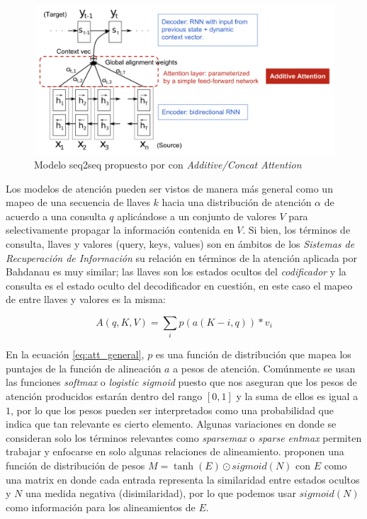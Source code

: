 \begin{figure}[ht!]
    \centering
    \includegraphics[width=0.8 \textwidth]{Chapters/2. Transformer/Figures/rnn/attention.png}
    \caption{Modelo seq2seq propuesto por \citeauthor*{bahdanau2016neural} con \textit{Additive/Concat Attention}}
    \label{fig:att}
\end{figure}

Los modelos de atención pueden ser vistos de manera más general como un mapeo de una secuencia de
llaves $k$ hacia una distribución de atención $\alpha$ de acuerdo a una consulta $q$ aplicándose a un
conjunto de valores $V$ para selectivamente propagar la información contenida en $V$.
Si bien, los términos de consulta, llaves y valores (query, keys, values)
son en ámbitos de los \textit{Sistemas de Recuperación de Información} su relación en términos de
la atención aplicada por Bahdanau es muy similar; las llaves son los estados ocultos del \textit{codificador}
y la consulta es el estado oculto del decodificador en cuestión, en este caso el mapeo de entre llaves
y valores es la misma:

\begin{equation}
    A(q, K, V) = \sum_i p(a(K-i, q)) * v_i
    \label{eq:att_general}
\end{equation}

En la ecuación \ref{eq:att_general}, $p$ es una función de distribución que mapea los puntajes de la
función de alineación $a$ a pesos de atención. Comúnmente se usan las funciones \textit{softmax} o
\textit{logistic sigmoid} puesto que nos aseguran que los pesos de atención producidos estarán dentro
del rango $[0,1]$ y la suma de ellos es igual a $1$, por lo que los pesos pueden ser interpretados como
una probabilidad que indica que tan relevante es cierto elemento. Algunas variaciones en donde se
consideran solo los términos relevantes como \textit{sparsemax} \citeauthor*{DBLP:journals/corr/MartinsA16}
o \textit{sparse entmax} \citeauthor*{DBLP:journals/corr/abs-2006-07214} permiten trabajar y enfocarse
en solo algunas relaciones de alineamiento. \citeauthor*{NEURIPS2019_16fc18d7} proponen una función de
distribución de pesos $M = \tanh(E) \odot sigmoid(N)$ con $E$ como una matrix en donde cada entrada
representa la similaridad entre estados ocultos y $N$ una medida negativa (disimilaridad), por lo que
podemos usar
$sigmoid(N)$ como información para  los alineamientos de $E$.

